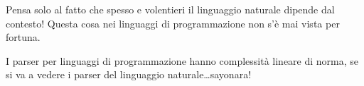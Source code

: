\documentclass[class=book, crop=false, oneside, 12pt]{standalone}
\begin{document}
Pensa solo al fatto che spesso e volentieri il linguaggio naturale dipende dal contesto! Questa cosa nei linguaggi di programmazione non s’è mai vista per fortuna.

I parser per linguaggi di programmazione hanno complessità lineare di norma, se si va a vedere i parser del linguaggio naturale\dots  sayonara!
\end{document}
